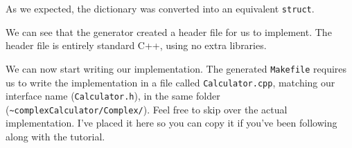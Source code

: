As we expected, the dictionary was converted into an equivalent
\texttt{struct}.

\begin{Shaded}
\begin{Highlighting}[]
 
\end{Highlighting}
\end{Shaded}

\begin{Shaded}
\begin{Highlighting}[]
 
 






\NormalTok{\}}
\NormalTok{\}}
\end{Highlighting}
\end{Shaded}

We can see that the generator created a header file for us to implement.
The header file is entirely standard C++, using no extra libraries.


We can now start writing our implementation. The generated
\texttt{Makefile} requires us to write the implementation in a file
called \texttt{Calculator.cpp}, matching our interface name
(\texttt{Calculator.h}), in the same folder
(\texttt{\textasciitilde{}complexCalculator/Complex/}). Feel free to
skip over the actual implementation. I've placed it here so you can copy
it if you've been following along with the tutorial.

\begin{Shaded}
\begin{Highlighting}[]
 
\end{Highlighting}
\end{Shaded}


